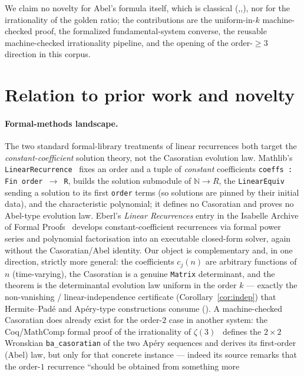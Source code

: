 \documentclass[11pt]{article}
\newcommand{\N}{\mathbb{N}}
\begin{document}
We claim no novelty for Abel's formula itself, which is classical
(\cite[Ch.~2]{elaydi},\cite{kelleypeterson},\cite{milnethomson}), nor for the
irrationality of the golden ratio; the contributions are the
uniform-in-$k$ machine-checked proof, the formalized fundamental-system converse, the
reusable machine-checked irrationality pipeline, and the opening of the order-$\ge3$
direction in this corpus.

\section{Relation to prior work and novelty}\label{sec:related}

\paragraph{Formal-methods landscape.}
The two standard formal-library treatments of linear recurrences both target the
\emph{constant-coefficient} solution theory, not the Casoratian evolution law.
Mathlib's \texttt{LinearRecurrence}~\cite{mathlib} fixes an order and a tuple of
\emph{constant} coefficients \texttt{coeffs : Fin order $\to$ R}, builds the solution
submodule of $\N\to R$, the \texttt{LinearEquiv} sending a solution to its first
\texttt{order} terms (so solutions are pinned by their initial data), and the
characteristic polynomial; it defines no Casoratian and proves no Abel-type evolution
law. Eberl's \emph{Linear Recurrences} entry in the Isabelle Archive of Formal
Proofs~\cite{eberl} develops constant-coefficient recurrences via formal power series
and polynomial factorisation into an executable closed-form solver, again without the
Casoratian/Abel identity. Our object is complementary and, in one direction, strictly
more general: the coefficients $c_j(n)$ are arbitrary functions of $n$ (time-varying),
the Casoratian is a genuine \texttt{Matrix} determinant, and the theorem is the
determinantal evolution law uniform in the order $k$ --- exactly the
non-vanishing / linear-independence certificate (Corollary~\ref{cor:indep}) that
Hermite--Pad\'e and Ap\'ery-type constructions consume (\cite{vdpoorten,beukers}). A
machine-checked Casoratian does already exist for the order-$2$ case in another system:
the Coq/MathComp formal proof of the irrationality of $\zeta(3)$~\cite{apery} defines
the $2\times2$ Wronskian \texttt{ba\_casoratian} of the two Ap\'ery sequences and
derives its first-order (Abel) law, but only for that concrete instance --- indeed its
source remarks that the order-$1$ recurrence ``should be obtained from something more
\end{document}

